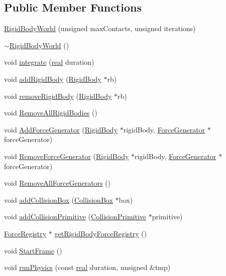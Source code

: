 \subsection*{Public Member Functions}
\begin{DoxyCompactItemize}
\item 
\hyperlink{classrum_1_1_rigid_body_world_a4ee28cf5c01d2501b86f1a561bd81b5b}{Rigid\+Body\+World} (unsigned max\+Contacts, unsigned iterations)
\item 
\hyperlink{classrum_1_1_rigid_body_world_ad3c644b75ec540c77eac4afdcb4fb894}{$\sim$\+Rigid\+Body\+World} ()
\item 
void \hyperlink{classrum_1_1_rigid_body_world_ad7112530d6702445b7ce3ed6d2364c5a}{integrate} (\hyperlink{namespacerum_a7e8cca23573d5eaead0f138cbaa4862c}{real} duration)
\item 
void \hyperlink{classrum_1_1_rigid_body_world_afaeef60e06bb9804ea2316dc6b7c2653}{add\+Rigid\+Body} (\hyperlink{classrum_1_1_rigid_body}{Rigid\+Body} $\ast$rb)
\item 
void \hyperlink{classrum_1_1_rigid_body_world_ad43516679c85851f227a3f637ec22a8f}{remove\+Rigid\+Body} (\hyperlink{classrum_1_1_rigid_body}{Rigid\+Body} $\ast$rb)
\item 
void \hyperlink{classrum_1_1_rigid_body_world_a8a5b1d19a8cc5cd6018ff3e4150e3a75}{Remove\+All\+Rigid\+Bodies} ()
\item 
void \hyperlink{classrum_1_1_rigid_body_world_ac31792a35fd305feb3b78317595b6a88}{Add\+Force\+Generator} (\hyperlink{classrum_1_1_rigid_body}{Rigid\+Body} $\ast$rigid\+Body, \hyperlink{classrum_1_1_force_generator}{Force\+Generator} $\ast$force\+Generator)
\item 
void \hyperlink{classrum_1_1_rigid_body_world_aab51d7273a8868425adfd4d7b9536ee0}{Remove\+Force\+Generator} (\hyperlink{classrum_1_1_rigid_body}{Rigid\+Body} $\ast$rigid\+Body, \hyperlink{classrum_1_1_force_generator}{Force\+Generator} $\ast$force\+Generator)
\item 
void \hyperlink{classrum_1_1_rigid_body_world_a8035c1b8adbf487d68bcbcea020acaa6}{Remove\+All\+Force\+Generators} ()
\item 
void \hyperlink{classrum_1_1_rigid_body_world_a8e771d43f2242d305055f2bd5017715d}{add\+Collision\+Box} (\hyperlink{classrum_1_1_collision_box}{Collision\+Box} $\ast$box)
\item 
void \hyperlink{classrum_1_1_rigid_body_world_a812a6ce6c6a1b577cf2cd8ef8d1fb525}{add\+Collision\+Primitive} (\hyperlink{classrum_1_1_collision_primitive}{Collision\+Primitive} $\ast$primitive)
\item 
\hyperlink{classrum_1_1_force_registry}{Force\+Registry} $\ast$ \hyperlink{classrum_1_1_rigid_body_world_ad48970bd5edc2982d4d64d9861a3f25d}{get\+Rigid\+Body\+Force\+Registry} ()
\item 
void \hyperlink{classrum_1_1_rigid_body_world_a104eac3b31fdb31280dc13345c2d8653}{Start\+Frame} ()
\item 
void \hyperlink{classrum_1_1_rigid_body_world_ae1e8c9b40613123a99dd14fe19926807}{run\+Physics} (const \hyperlink{namespacerum_a7e8cca23573d5eaead0f138cbaa4862c}{real} duration, unsigned \&tmp)
\end{DoxyCompactItemize}
